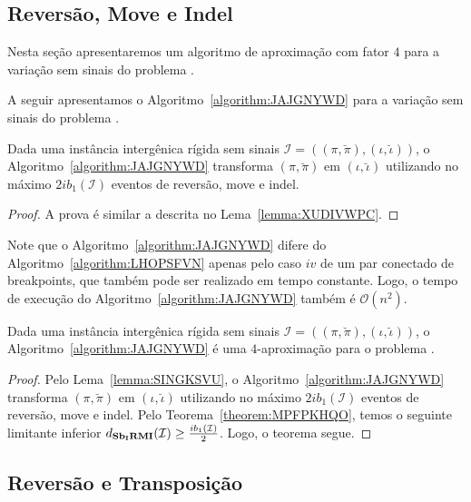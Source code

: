 \subsection{Reversão, Move e Indel}

Nesta seção apresentaremos um algoritmo de aproximação com fator $4$ para a variação sem sinais do problema \SbIRMI{}. 

A seguir apresentamos o Algoritmo~\ref{algorithm:JAJGNYWD} para a variação sem sinais do problema \SbIRMI{}.



\begin{lemma}\label{lemma:SINGKSVU}
Dada uma instância intergênica rígida sem sinais $\mathcal{I}=((\pi,\breve\pi),(\iota,\breve\iota))$, o Algoritmo~\ref{algorithm:JAJGNYWD} transforma $(\pi,\breve\pi)$ em $(\iota,\breve\iota)$ utilizando no máximo $2ib_1(\mathcal{I})$ eventos de reversão, move e indel.
\end{lemma}
\begin{proof}
  A prova é similar a descrita no Lema~\ref{lemma:XUDIVWPC}.
\end{proof}

Note que o Algoritmo~\ref{algorithm:JAJGNYWD} difere do Algoritmo~\ref{algorithm:LHOPSFVN} apenas pelo caso $iv$ de um par conectado de breakpoints, que também pode ser realizado em tempo constante. Logo, o tempo de execução do Algoritmo~\ref{algorithm:JAJGNYWD} também é $\mathcal{O}(n^2)$.

\begin{theorem}\label{theorem:WSCHLXXJ}
Dada uma instância intergênica rígida sem sinais $\mathcal{I}=((\pi,\breve\pi),(\iota,\breve\iota))$, o Algoritmo~\ref{algorithm:JAJGNYWD} é uma $4$-aproximação para o problema \SbIRMI{}.
\end{theorem}
\begin{proof}
Pelo Lema~\ref{lemma:SINGKSVU}, o Algoritmo~\ref{algorithm:JAJGNYWD} transforma $(\pi,\breve\pi)$ em $(\iota,\breve\iota)$ utilizando no máximo $2ib_1(\mathcal{I})$ eventos de reversão, move e indel. Pelo Teorema~\ref{theorem:MPFPKHQO}, temos o seguinte limitante inferior $d_{\textbf{Sb\textsubscript{I}RMI}}(\mathcal{I}) \ge \frac{ib_1(\mathcal{I})}{2}$. Logo, o teorema segue. 
\end{proof}


\subsection{Reversão e Transposição}

